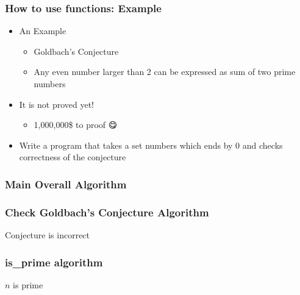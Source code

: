 \documentclass{../c-lecture}
\begin{document}
\begin{frame}
  \frametitle{How to use functions: Example}
  \begin{itemize}
    \item An Example
    \begin{itemize}
      \item Goldbach’s Conjecture
      \item
        Any even number larger than 2 can be expressed as sum of two prime
        numbers
    \end{itemize}
    \item It is not proved yet!
    \begin{itemize}
      \item 1,000,000\$ to proof 😋
    \end{itemize}
    \item
      Write a program that takes a set numbers which ends by 0 and checks
      correctness of the conjecture
  \end{itemize}
\end{frame}

\begin{frame}[fragile]
  \frametitle{Main Overall Algorithm}
  \begin{algorithm}[H]
  \end{algorithm}
\end{frame}

\begin{frame}[fragile]
  \frametitle{Check Goldbach's Conjecture Algorithm}
  \begin{algorithm}[H]
  \end{algorithm}
  \begin{block}{}
Conjecture is incorrect
  \end{block}
\end{frame}

\begin{frame}
  \frametitle{is\_prime algorithm}
  \begin{algorithm}[H]
  $n$ is prime\;
  \end{algorithm}
\end{frame}
\end{document}
